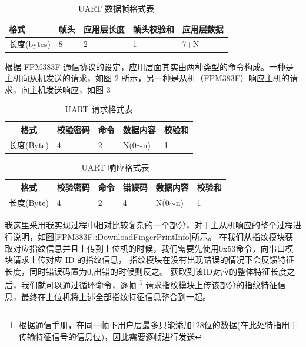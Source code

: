     \begin{table}[H]
        \centering
        \begin{tabular}{lllll}
        \hline
        格式        & 帧头 & 应用层长度 & 帧头校验和 & 应用层数据 \\ \hline
        长度(bytes) & 8  & 2     & 1     & 7+N   \\ \hline
        \end{tabular}
        \caption{UART 数据帧格式表} \label{FPM383F::UARTdataFrame}
    \end{table}
    
    根据 FPM383F 通信协议的设定，应用层面其实由两种类型的命令构成。一种是主机向从机发送的请求，如图 \ref{FPM383F::UARTUserRequest}
    所示，另一种是从机（FPM383F）响应主机的请求，向主机发送响应，如图 \ref{FPM383F::UARTUserResponse}

    \begin{table}[H]
        \centering
        \begin{tabular}{lllll}
        \hline
        \multicolumn{1}{c}{格式} & 校验密码 & 命令 & 数据内容        & 校验和 \\ \hline
        长度(Byte)                 & 4    & 2  & N(0$\sim$n) & 1   \\ \hline
        \end{tabular}
        \caption{UART 请求格式表} \label{FPM383F::UARTUserRequest}
    \end{table}

    \begin{table}[H]
        \centering
        \begin{tabular}{llllll}
        \hline
        \multicolumn{1}{c}{格式} & 校验密码 & 命令 & 错误码 & 数据内容        & 校验和 \\ \hline
        长度(Byte)                 & 4    & 2  & 4   & N(0$\sim$n) & 1   \\ \hline
        \end{tabular}
        \caption{UART 响应格式表} \label{FPM383F::UARTUserResponse}
    \end{table}

    我这里采用我实现过程中相对比较复杂的一个部分，对于主从机响应的整个过程进行说明，如图\ref{FPM383F::DownloadFingerPrintInfo}所示。
    在我们从指纹模块获取对应指纹信息并且上传到上位机的时候，我们需要先使用0x53命令，向串口模块请求上传对应 ID 的指纹信息，
    指纹模块在没有出现错误的情况下会反馈特征长度，同时错误码置为0,出错的时候则反之。
    获取到该ID对应的整体特征长度之后，我们就可以通过循环命令，逐帧
    \footnote{根据通信手册，在同一帧下用户层最多只能添加128位的数据(在此处特指用于传输特征信号的信息位)，因此需要逐帧进行发送}
    请求指纹模块上传该部分的指纹特征信息，最终在上位机将上述全部指纹特征信息整合到一起。

